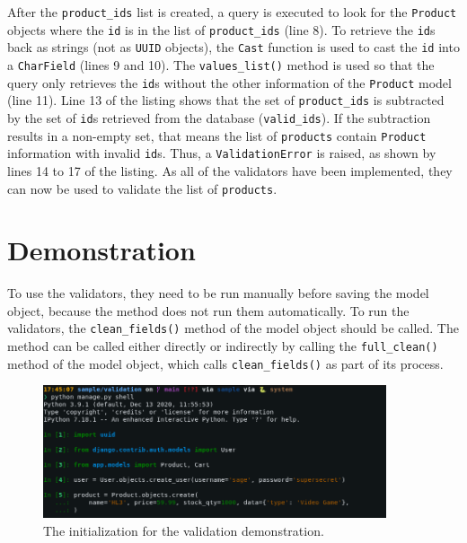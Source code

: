 After the \verb|product_ids| list is created, a query is executed to look for
the \verb|Product| objects where the \verb|id| is in the list of
\verb|product_ids| (line 8). To retrieve the \verb|id|s back as strings (not as
\verb|UUID| objects), the \verb|Cast| function is used to cast the \verb|id|
into a \verb|CharField| (lines 9 and 10). The \verb|values_list()| method is
used so that the query only retrieves the \verb|id|s without the other
information of the \verb|Product| model (line 11). Line 13 of the listing shows
that the set of \verb|product_ids| is subtracted by the set of \verb|id|s
retrieved from the database (\verb|valid_ids|). If the subtraction results in a
non-empty set, that means the list of \verb|products| contain \verb|Product|
information with invalid \verb|id|s. Thus, a \verb|ValidationError| is raised,
as shown by lines 14 to 17 of the listing. As all of the validators have been
implemented, they can now be used to validate the list of \verb|products|.

\section{Demonstration}

To use the validators, they need to be run manually before saving the model
object, because the method does not run them automatically. To run the
validators, the \verb|clean_fields()| method of the model object should be
called. The method can be called either directly or indirectly by calling the
\verb|full_clean()| method of the model object, which calls
\verb|clean_fields()| as part of its process.

\begin{figure}
	\centering
    \includegraphics[width=0.90\textwidth]{pics/validation0.png}
	\caption{The initialization for the validation demonstration.}
	\label{fig:validation0}
\end{figure}

